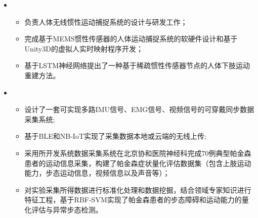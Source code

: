 \begin{itemize}[leftmargin=*]
    \item {}
    {\small
    \begin{itemize}
      \item 负责人体无线惯性运动捕捉系统的设计与研发工作；
      \item 完成基于MEMS惯性传感器的人体运动捕捉系统的软硬件设计和基于Unity3D的虚拟人实时映射程序开发；
      \item 基于LSTM神经网络提出了一种基于稀疏惯性传感器节点的人体下肢运动重建方法。
    \end{itemize}
    }

    \item {}
    {\small
    \begin{itemize}
      \item 设计了一套可实现多路IMU信号、EMG信号、视频信号的可穿戴同步数据采集系统;
      \item 基于BLE和NB-IoT实现了采集数据本地或云端的无线上传;
      \item 采用所开发系统数据采集系统在北京协和医院神经科完成70例典型帕金森患者的运动信息采集，构建了帕金森症状量化评估数据集（包含上肢运动能力，步态运动信息，视频信息以及声音等）；
      \item 对实验采集所得数据进行标准化处理和数据挖掘，结合领域专家知识进行特征工程，基于RBF-SVM实现了帕金森患者的步态障碍和运动能力的量化评估与异常步态检测。
    \end{itemize}
    }

  \end{itemize}
